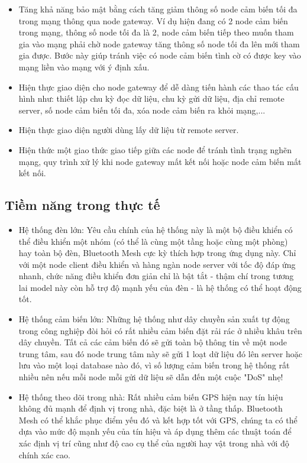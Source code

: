     \begin{itemize}
        \item Tăng khả năng bảo mật bằng cách tăng giảm thông số node cảm biến tối đa trong mạng thông qua node gateway. Ví dụ hiện đang có 2 node cảm biến trong mạng, thông số node tối đa là 2, node cảm biến tiếp theo muốn tham gia vào mạng phải chờ node gateway tăng thông số node tối đa lên mới tham gia được. Bước này giúp tránh việc có node cảm biến tình cờ có được key vào mạng liền vào mạng với ý định xấu.
        \item Hiện thực giao diện cho node gateway để dễ dàng tiến hành các thao tác cấu hình như: thiết lập chu kỳ đọc dữ liệu, chu kỳ gửi dữ liệu, địa chỉ remote server, số node cảm biến tối đa, xóa node cảm biến ra khỏi mạng,...
        \item Hiện thực giao diện người dùng lấy dữ liệu từ remote server.
        \item Hiện thức một giao thức giao tiếp giữa các node để tránh tình trạng nghẽn mạng, quy trình xử lý khi node gateway mất kết nối hoặc node cảm biến mất kết nối.
    \end{itemize}
    
    \subsection{Tiềm năng trong thực tế}
    \begin{itemize}
        \item Hệ thống đèn lớn: Yêu cầu chính của hệ thống này là một bộ điều khiển có thể điều khiển một nhóm (có thể là cùng một tầng hoặc cùng một phòng) hay toàn bộ đèn, Bluetooth Mesh cực kỳ thích hợp trong ứng dụng này. Chỉ với một node client điều khiển và hàng ngàn node server với tốc độ đáp ứng nhanh, chức năng điều khiển đơn giản chỉ là bật tắt - thậm chí trong tương lai model này còn hỗ trợ độ mạnh yếu của đèn - là hệ thống có thể hoạt động tốt.
        \item Hệ thống cảm biến lớn: Những hệ thống như dây chuyền sản xuất tự động trong công nghiệp đòi hỏi có rất nhiều cảm biến đặt rải rác ở nhiều khâu trên dây chuyền. Tất cả các cảm biến đó sẽ gửi toàn bộ thông tin về một node trung tâm, sau đó node trung tâm này sẽ gửi 1 loạt dữ liệu đó lên server hoặc lưu vào một loại database nào đó, vì số lượng cảm biến trong hệ thống rất nhiều nên nếu mỗi node mỗi gửi dữ liệu sẽ dẫn đến một cuộc "DoS" nhẹ!
        \item Hệ thống theo dõi trong nhà: Rất nhiều cảm biến GPS hiện nay tín hiệu không đủ mạnh để định vị trong nhà, đặc biệt là ở tầng thấp. Bluetooth Mesh có thể khắc phục điểm yếu đó và kết hợp tốt với GPS, chúng ta có thể dựa vào mức độ mạnh yếu của tín hiệu và áp dụng thêm các thuật toán để xác định vị trí cũng như độ cao cụ thể của người hay vật trong nhà với độ chính xác cao.
    \end{itemize}